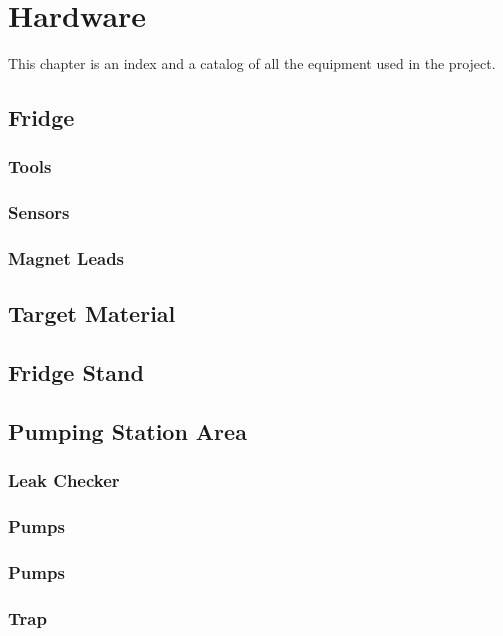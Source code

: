 \chapter{Hardware}
\label{hardware}

This chapter is an index and a catalog of all the equipment used in the project.
 
\section{Fridge}
  \subsection{Tools}
  \subsection{Sensors}
  \subsection{Magnet Leads}

\section{Target Material}

\section{Fridge Stand}

\section{Pumping Station Area}
  \subsection{Leak Checker}
  \subsection{\het{} Pumps} %
  \subsection{\hef{} Pumps}
  \subsection{\lnn{} Trap}
  
